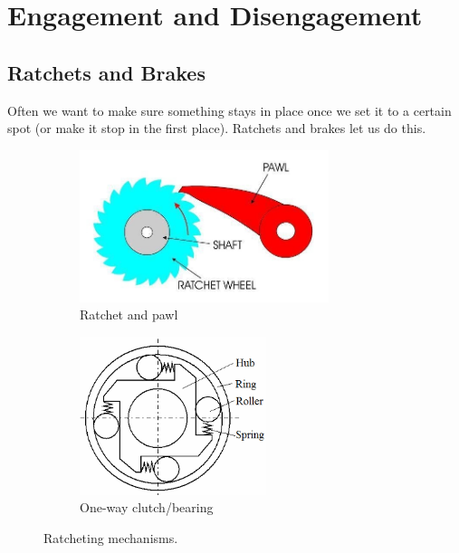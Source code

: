 \newpage
\section{Engagement and Disengagement} \label{section:disengagement}

\subsection{Ratchets and Brakes}

Often we want to make sure something stays in place once we set it to a certain spot (or make it stop in the first place). Ratchets and brakes let us do this.

\begin{figure}[H]
	\begin{subfigure}[b]{.4\linewidth}
		\includegraphics[width=0.8\textwidth]{imgs/ratchet.jpeg}
		\caption{Ratchet and pawl}
	\end{subfigure}\begin{subfigure}[b]{.4\linewidth}
		\includegraphics[width=0.6\textwidth]{imgs/oneway_clutch.png}
		\caption{One-way clutch/bearing}
	\end{subfigure}
	\caption{Ratcheting mechanisms.}
\end{figure}

